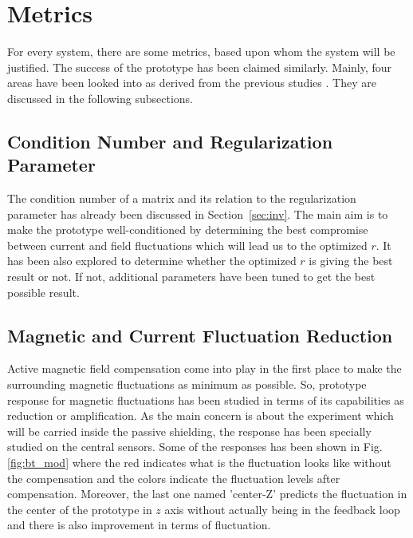 \section{Metrics\label{sec:metrics}}
For every system, there are some metrics, based upon whom the system will be justified. The success of the prototype has been claimed similarly. Mainly, four areas have been looked into as derived from the previous studies \cite{bea,lins,rawlik}. They are discussed in the following subsections.

\subsection{Condition Number and Regularization Parameter}
The condition number of a matrix and its relation to the regularization parameter has already been discussed in Section~\ref{sec:inv}. The main aim is to make the prototype well-conditioned by determining the best compromise between current and field fluctuations which will lead us to the optimized $r$. It has been also explored to determine whether the optimized $r$ is giving the best result or not. If not, additional parameters have been tuned to get the best possible result.

\subsection{Magnetic and Current Fluctuation Reduction}

Active magnetic field compensation come into play in the first place to make the surrounding magnetic fluctuations as minimum as possible. So, prototype response for magnetic fluctuations has been studied in terms of its capabilities as reduction or amplification. As the main concern is about the experiment which will be carried inside the passive shielding, the response has been specially studied on the central sensors. Some of the responses has been shown in Fig. \ref{fig:bt_mod} where the red indicates what is the fluctuation looks like without the compensation and the colors indicate the fluctuation levels after compensation. Moreover, the last one named 'center-Z' predicts the fluctuation in the center of the prototype in $z$ axis without actually being in the feedback loop and there is also improvement in terms of fluctuation.


